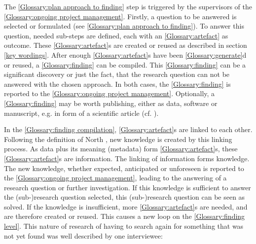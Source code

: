 \documentclass{bausteinefdm}
\begin{document}
The \ref{Glossary:plan approach to finding} step is triggered by the supervisors of the \ref{Glossary:ongoing project management}.
Firstly, a question to be answered is selected or formulated (see \ref{Glossary:plan approach to finding}).
To answer this question, needed sub-steps are defined, each with an \ref{Glossary:artefact} as outcome.
These \ref{Glossary:artefact}s are created or reused as described in section \ref{key wordings}.
After enough \ref{Glossary:artefact}s have been \ref{Glossary:generate}d or reused, a \ref{Glossary:finding} can be compiled.
This \ref{Glossary:finding} can be a significant discovery or just the fact, that the research question can not be answered with the chosen approach.
In both cases, the \ref{Glossary:finding} is reported to the \ref{Glossary:ongoing project management}.
Optionally, a \ref{Glossary:finding} may be worth publishing, either as data, software or manuscript, e.g. in form of a scientific article (cf. ).

In the \ref{Glossary:finding compilation}, \ref{Glossary:artefact}s are linked to each other. %
Following the definition of North \cite{North.2021}, new knowledge is created by this linking process.
As data plus its meaning (metadata) form \ref{Glossary:artefact}s, these \ref{Glossary:artefact}s are information.
The linking of information forms knowledge. \cite{DINDeutschesInstitutfurNormunge.V..092015}
The new knowledge, whether expected, anticipated or unforeseen is reported to the \ref{Glossary:ongoing project management}, leading to the answering of a research question or further investigation.
If this knowledge is sufficient to answer the (sub-)research question selected, this (sub-)research question can be seen as solved. 
If the knowledge is insufficient, more \ref{Glossary:artefact}s are needed, and are therefore created or reused.
This causes a new loop on the \ref{Glossary:finding level}.
This nature of research of having to search again for something that was not yet found was well described by one interviewee:
\end{document}
